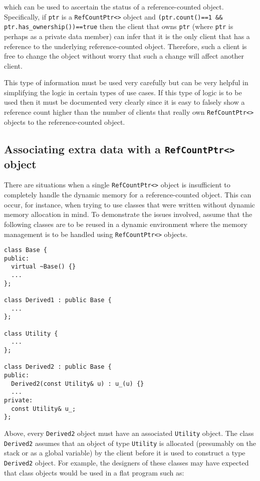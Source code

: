 {}\noindent{}which can be used to ascertain the status of a
reference-counted object.  Specifically, if {}\texttt{ptr} is a
{}\texttt{Ref\-Count\-Ptr<>} object and {}\texttt{(ptr.count()==1 \&\&
ptr.has\_ownership())==true} then the client that owns {}\texttt{ptr}
(where {}\texttt{ptr} is perhaps as a private data member) can infer
that it is the only client that has a reference to the underlying
reference-counted object. Therefore, such a client is free to change
the object without worry that such a change will affect another
client.

This type of information must be used very carefully but can be very
helpful in simplifying the logic in certain types of use cases. If
this type of logic is to be used then it must be documented very
clearly since it is easy to falsely show a reference count higher than
the number of clients that really own {}\texttt{Ref\-Count\-Ptr<>} objects
to the reference-counted object.

%
\subsection{Associating extra data with a {}\texttt{Ref\-Count\-Ptr<>} object}
\label{rcp:sec:extra-data}
%

There are situations when a single {}\texttt{Ref\-Count\-Ptr<>} object
is insufficient to completely handle the dynamic memory for a
reference-counted object.  This can occur, for instance, when trying
to use classes that were written without dynamic memory allocation in
mind.  To demonstrate the issues involved, assume that the following
classes are to be reused in a dynamic environment where the memory
management is to be handled using {}\texttt{Ref\-Count\-Ptr<>}
objects.

{\scriptsize\begin{verbatim}
class Base {
public:
  virtual ~Base() {}
  ...
};

class Derived1 : public Base {
  ...
};

class Utility {
  ...
};

class Derived2 : public Base {
public:
  Derived2(const Utility& u) : u_(u) {}
  ...
private:
  const Utility& u_;
};
\end{verbatim}}

{}\noindent{}Above, every {}\texttt{Derived2} object must have an
associated {}\texttt{Utility} object.  The class {}\texttt{Derived2}
assumes that an object of type {}\texttt{Utility} is allocated
(presumably on the stack or as a global variable) by the client before
it is used to construct a type {}\texttt{Derived2} object.  For
example, the designers of these classes may have expected that class
objects would be used in a flat program such as:

